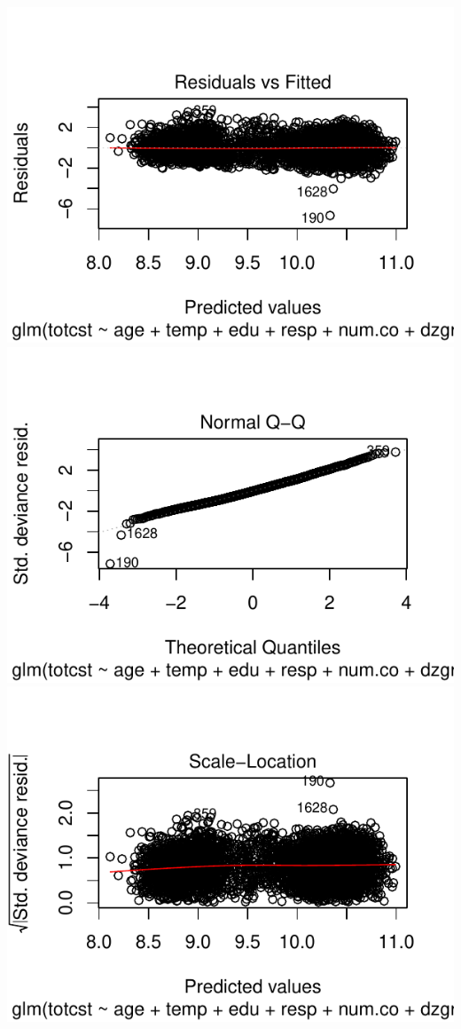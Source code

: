 \documentclass[
]{article}
\begin{document}
\includegraphics{Eksamensbesvarelse_files/figure-latex/unnamed-chunk-19-1.pdf}
\includegraphics{Eksamensbesvarelse_files/figure-latex/unnamed-chunk-19-2.pdf}
\includegraphics{Eksamensbesvarelse_files/figure-latex/unnamed-chunk-19-3.pdf}
\end{document}
